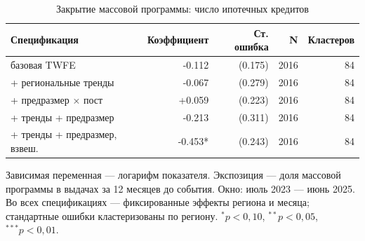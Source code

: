 \begin{table}[htbp]
\centering
\small
\caption{Закрытие массовой программы: число ипотечных кредитов}
\label{tab:specs_count}
\begin{tabular}{lrrrr}
\toprule
Спецификация & Коэффициент & Ст. ошибка & N & Кластеров \\
\midrule
базовая TWFE & -0.112 & (0.175) & 2016 & 84 \\
+ региональные тренды & -0.067 & (0.279) & 2016 & 84 \\
+ предразмер × пост & +0.059 & (0.223) & 2016 & 84 \\
+ тренды + предразмер & -0.213 & (0.311) & 2016 & 84 \\
+ тренды + предразмер, взвеш. & -0.453* & (0.243) & 2016 & 84 \\
\bottomrule
\end{tabular}
\par\smallskip\begin{minipage}{0.92\textwidth}\footnotesize
Зависимая переменная — логарифм показателя. Экспозиция — доля массовой программы в выдачах за 12 месяцев до события. Окно: июль 2023 — июнь 2025. Во всех спецификациях — фиксированные эффекты региона и месяца; стандартные ошибки кластеризованы по региону. $^{*}p<0{,}10$, $^{**}p<0{,}05$, $^{***}p<0{,}01$.
\end{minipage}
\end{table}
